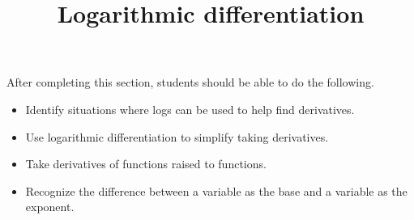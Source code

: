 \documentclass{ximera}
\title{Logarithmic differentiation}
\begin{document}
\begin{abstract}
\end{abstract}

\maketitle

\begin{sectionOutcomes}

After completing this section, students should be able to do the following.

\begin{itemize}
	\item Identify situations where logs can be used to help find derivatives.
	\item Use logarithmic differentiation to simplify taking derivatives.
	\item Take derivatives of functions raised to functions.
	\item Recognize the difference between a variable as the base and a variable as the exponent.
\end{itemize}

\end{sectionOutcomes}
\end{document}
